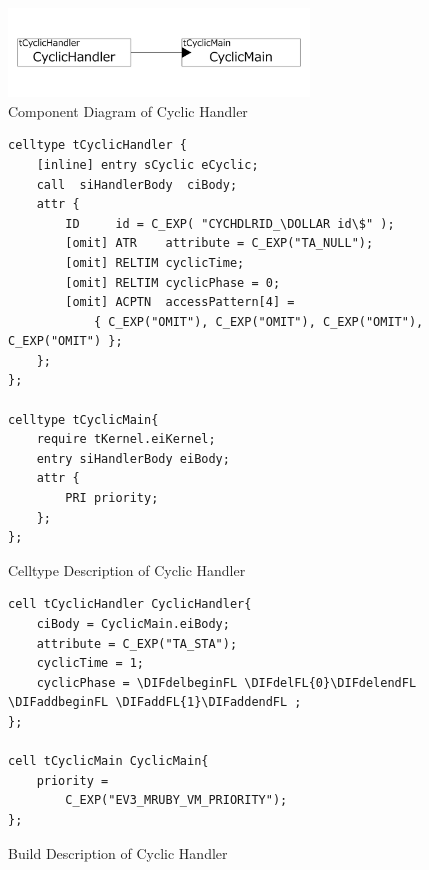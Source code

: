 \documentclass[conference,compsoc]{IEEEtran}
\providecommand{\DIFadd}[1]{{\protect\color{blue}\uwave{#1}}} %
\providecommand{\DIFdel}[1]{{\protect\color{red}\sout{#1}}}                      %
\providecommand{\DIFdelbegin}{} %
\providecommand{\DIFdelend}{} %
\providecommand{\DIFaddFL}[1]{\DIFadd{#1}} %
\providecommand{\DIFdelFL}[1]{\DIFdel{#1}} %
\providecommand{\DIFaddbeginFL}{} %
\providecommand{\DIFaddendFL}{} %
\providecommand{\DIFdelbeginFL}{} %
\providecommand{\DIFdelendFL}{} %
\begin{document}
\begin{figure}[t]
    \centering
    \includegraphics[width=8cm,clip]{figure/cyclic_handler.pdf}
    \caption{Component Diagram of Cyclic Handler}
    \label{fig:cyclic_handler}
\end{figure}
\begin{figure}[t]
    \centering
    \begin{lstlisting}
celltype tCyclicHandler {
    [inline] entry sCyclic eCyclic;
    call  siHandlerBody  ciBody;
    attr {
    	ID     id = C_EXP( "CYCHDLRID_\DOLLAR id\$" );
    	[omit] ATR    attribute = C_EXP("TA_NULL");
    	[omit] RELTIM cyclicTime;
    	[omit] RELTIM cyclicPhase = 0;
        [omit] ACPTN  accessPattern[4] =
            { C_EXP("OMIT"), C_EXP("OMIT"), C_EXP("OMIT"), C_EXP("OMIT") };
    };
};

celltype tCyclicMain{
    require tKernel.eiKernel;
    entry siHandlerBody eiBody;
    attr {
        PRI priority;
    };
};
    \end{lstlisting}
    \caption{Celltype Description of Cyclic Handler}
    \label{celltype_cyclic_handler}
\end{figure}
\DIFdelbegin %

\DIFdelend \begin{figure}[t]
    \centering
    \begin{lstlisting}
cell tCyclicHandler CyclicHandler{
    ciBody = CyclicMain.eiBody;
    attribute = C_EXP("TA_STA");
    cyclicTime = 1;
    cyclicPhase = \DIFdelbeginFL \DIFdelFL{0}\DIFdelendFL \DIFaddbeginFL \DIFaddFL{1}\DIFaddendFL ;
};

cell tCyclicMain CyclicMain{
    priority =
        C_EXP("EV3_MRUBY_VM_PRIORITY");
};
   \end{lstlisting}
    \caption{Build Description of Cyclic Handler}
    \label{build_cyclic_handler}
\end{figure}
\end{document}
